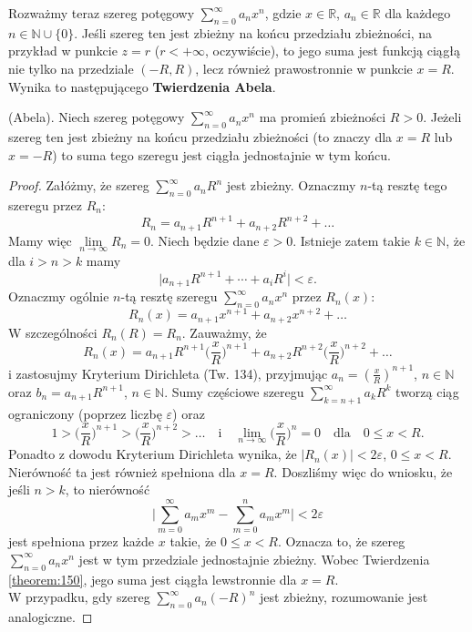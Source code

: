 \documentclass[leqno]{article}
\begin{document}
\begin{justify}
Rozważmy teraz szereg potęgowy $\sum\limits_{n=0}^{\infty}a_n x^n$, gdzie $x \in \mathbb{R}$, $a_n \in \mathbb{R}$ dla każdego $n \in \mathbb{N} \cup \{0\}$.
Jeśli szereg ten jest zbieżny na końcu przedziału zbieżności, na przykład w punkcie $z = r$ ($r < +\infty$, oczywiście), to jego suma jest funkcją ciągłą nie tylko na przedziale 
$(-R, R)$, lecz również prawostronnie w punkcie $x = R$. Wynika to następującego \textbf{Twierdzenia Abela}.

\begin{theorem}
{
    (Abela). Niech szereg potęgowy $\sum\limits_{n=0}^{\infty}a_n x^n$ ma promień zbieżności $R > 0$. Jeżeli szereg ten jest
    zbieżny na końcu przedziału zbieżności (to znaczy dla $x = R$ lub $x = -R$) to suma tego szeregu jest ciągła jednostajnie w tym końcu.
}
\end{theorem}

\begin{proof}
    Załóżmy, że szereg $\sum\limits_{n=0}^{\infty}a_n R^n$ jest zbieżny. Oznaczmy $n$-tą resztę tego szeregu przez $R_n$:
    \[
        R_n = a_{n+1}R^{n+1} + a_{n+2}R^{n+2} + \ldots
    \]
    Mamy więc $\lim\limits_{n \to \infty} R_n = 0$. Niech będzie dane $\varepsilon > 0$. Istnieje zatem takie $k \in \mathbb{N}$, że dla
    $i > n > k$ mamy 
    \[
        \big| a_{n+1}R^{n+1} + \cdots + a_{i}R^{i} \big| < \varepsilon.
    \]
    Oznaczmy ogólnie $n$-tą resztę szeregu $\sum\limits_{n=0}^{\infty}a_n x^n$ przez $R_n(x)$:
    \[
        R_n(x) = a_{n+1}x^{n+1} + a_{n+2}x^{n+2} + \ldots
    \]
    W szczególności $R_n(R) = R_n$. Zauważmy, że 
    \[
        R_n(x) = a_{n+1}R^{n+1}\Big(\frac{x}{R}\Big)^{n+1} + a_{n+2}R^{n+2}\Big(\frac{x}{R}\Big)^{n+2}+ \ldots
    \]
    i zastosujmy Kryterium Dirichleta (Tw. 134), przyjmując $a_n = (\frac{x}{R})^{n+1}$, $n \in \mathbb{N}$ oraz
    $b_n = a_{n+1}R^{n+1}$, $n \in \mathbb{N}$. Sumy częściowe szeregu $\sum\limits_{k=n+1}^{\infty}a_k R^k$
    tworzą ciąg ograniczony (poprzez liczbę $\varepsilon$) oraz
    \[
        1 > \Big(\frac{x}{R}\Big)^{n+1} > \Big(\frac{x}{R}\Big)^{n+2} > \ldots \quad \text{i} \quad 
        \lim_{n \to \infty}\Big(\frac{x}{R}\Big)^n = 0 \quad \text{dla} \quad 0 \leqslant x < R.
    \]
    Ponadto z dowodu Kryterium Dirichleta wynika, że $|R_n(x)| < 2 \varepsilon$, $0 \leqslant x < R$.
    Nierówność ta jest również spełniona dla $x = R$. Doszliśmy więc do wniosku, że jeśli $n > k$, to nierówność
    \[
        \Bigg|\sum_{m=0}^{\infty}a_m x^m - \sum_{m=0}^{n}a_m x^m \Bigg|< 2 \varepsilon
    \]
    jest spełniona przez każde $x$ takie, że $0 \leqslant x < R$. Oznacza to, że szereg
    $\sum\limits_{n=0}^{\infty}a_n x^n$ jest w tym przedziale jednostajnie zbieżny. Wobec Twierdzenia \ref{theorem:150}, jego suma jest ciągła lewstronnie
    dla $x = R$. \\
    W przypadku, gdy szereg $\sum\limits_{n=0}^{\infty}a_n (-R)^n$ jest zbieżny, rozumowanie jest analogiczne.
\end{proof}


\end{justify}
\end{document}
